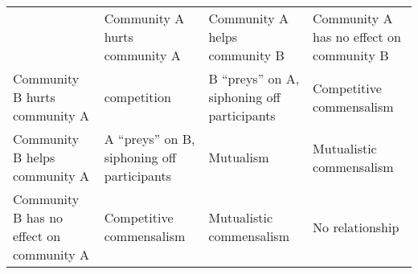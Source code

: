 
\small
  \begin{tabular}{*{4}{m{}}}
    \hline
    & Community A hurts \newline community A & Community A helps community B  & Community A has no effect on community B \\
    Community B hurts \newline community A & competition & B ``preys'' on A, siphoning off participants & Competitive \newline commensalism \\
    Community B helps \newline  community A & A ``preys'' on B, siphoning off participants  & Mutualism & Mutualistic \newline commensalism \\
    Community B  has no effect on community A & Competitive \newline commensalism &  Mutualistic \newline commensalism & No relationship \\ \hline
\end{tabular}



